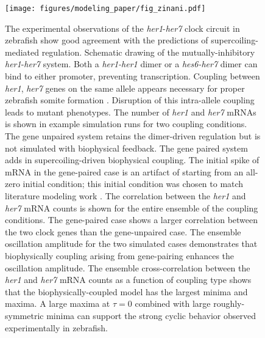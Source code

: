 \documentclass[11pt]{article}
\begin{document}
\begin{figure}[htbp]
    \centering
    {\texttt{[image: figures/modeling\_paper/fig\_zinani.pdf]}
    \label{fig:her1_her7_cartoon}
    \label{fig:zinani_summary_cartoon}
    \label{fig:zinani_mRNA_behavior}
    \label{fig:zinani_correlation_coeff}
    \label{fig:zinani_oscillation_amplitude}
    \label{fig:zinani_cross_correlation}
    }
\end{figure}
\begin{figure}[htbp]
    \ContinuedFloat
    \caption{The experimental observations of the \textit{her1}-\textit{her7} clock circuit in zebrafish\parencite{zinaniPairingSegmentationClock2021} show good agreement with the predictions of supercoiling-mediated regulation.
         Schematic drawing of the mutually-inhibitory \textit{her1}-\textit{her7} system. Both a \textit{her1-her1} dimer or a \textit{hes6-her7} dimer can bind to either promoter, preventing transcription.
         Coupling between \textit{her1}, \textit{her7} genes on the same allele appears necessary for proper zebrafish somite formation \parencite{zinaniPairingSegmentationClock2021}. Disruption of this intra-allele coupling leads to mutant phenotypes.
         The number of \textit{her1} and \textit{her7} mRNAs is shown in example simulation runs for two coupling conditions. The gene unpaired system retains the dimer-driven regulation but is not simulated with biophysical feedback. The gene paired system adds in supercoiling-driven biophysical coupling. The initial spike of mRNA in the gene-paired case is an artifact of starting from an all-zero initial condition; this initial condition was chosen to match literature modeling work \parencite{zinaniPairingSegmentationClock2021}.
         The correlation between the \textit{her1} and \textit{her7} mRNA counts is shown for the entire ensemble of the coupling conditions. The gene-paired case shows a larger correlation between the two clock genes than the gene-unpaired case.
         The ensemble oscillation amplitude for the two simulated cases demonstrates that biophysically coupling arising from gene-pairing enhances the oscillation amplitude.
         The ensemble cross-correlation between the \textit{her1} and \textit{her7} mRNA counts as a function of coupling type shows that the biophysically-coupled model has the largest minima and maxima. A large maxima at \(\tau = 0\) combined with large roughly-symmetric minima can support the strong cyclic behavior observed experimentally in zebrafish. %
    } \label{fig:top:her1_her7}
\end{figure}
\end{document}
